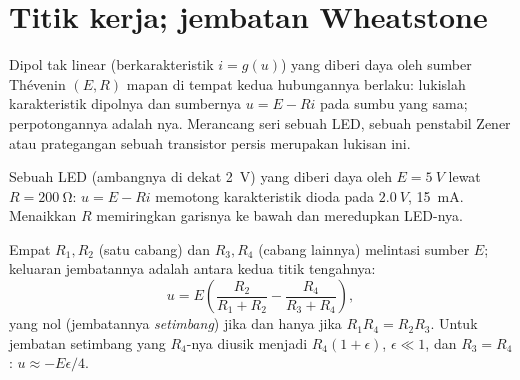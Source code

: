 \section{Titik kerja; jembatan Wheatstone}

\begin{method}\label{met:b1:dc-circuits:loadline}
Dipol tak linear (berkarakteristik $i = g(u)$) yang diberi daya oleh
sumber Thévenin $(E, R)$ mapan di tempat kedua hubungannya berlaku:
lukislah karakteristik dipolnya dan \emph{} sumbernya
$u = E - Ri$ pada sumbu yang sama; perpotongannya adalah \emph{}nya. Merancang  seri sebuah LED, sebuah penstabil Zener
atau prategangan sebuah transistor persis merupakan lukisan ini.
\end{method}

\begin{omfigure}

{\small Sebuah LED (ambangnya di dekat \qty{2}{V}) yang diberi daya oleh
$E = \qty{5}{V}$ lewat $R = \qty{200}{\ohm}$: 
$u = E - Ri$ memotong karakteristik dioda pada $\qty{2.0}{V}$,
\qty{15}{mA}. Menaikkan $R$ memiringkan garisnya ke bawah dan meredupkan LED-nya.}
\end{omfigure}

\begin{proposition}\label{prop:b1:dc-circuits:wheatstone}
Empat  $R_1, R_2$ (satu cabang) dan $R_3, R_4$ (cabang lainnya)
melintasi sumber $E$; keluaran jembatannya adalah  antara kedua
titik tengahnya:
\[
u = E\left(\frac{R_2}{R_1 + R_2} - \frac{R_4}{R_3 + R_4}\right),
\]
yang nol (jembatannya \emph{setimbang}) jika dan hanya jika
$R_1R_4 = R_2R_3$. Untuk jembatan setimbang yang $R_4$-nya diusik
menjadi $R_4(1 + \epsilon)$, $\epsilon
\ll 1$, dan $R_3 = R_4$: $u \approx -E\epsilon/4$.
\end{proposition}

